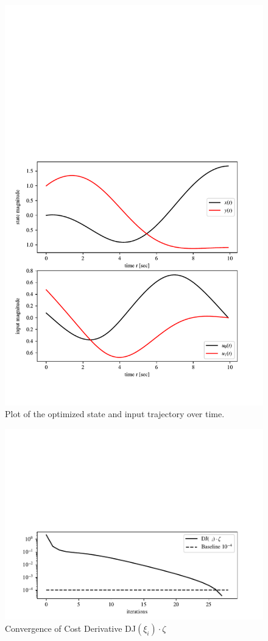 \begin{figure}[h]
    \centering
    \includegraphics[]{hw5.pdf}
    \vspace{-5mm}
    \caption{Plot of the optimized state and input trajectory over time.}
    \label{fig:ergodic_time}
\end{figure}
\begin{figure}[h]
    \centering
    \includegraphics[]{hw5_convergence.pdf}
    \vspace{-5mm}
    \caption{Convergence of Cost Derivative DJ$(\xi_i)\cdot\zeta$}
    \label{fig:convergence}
\end{figure}
